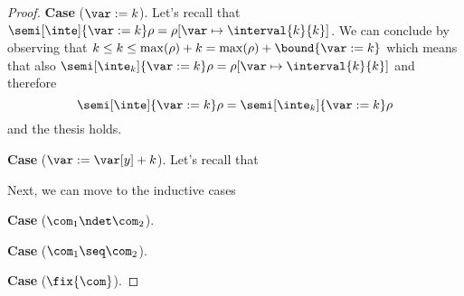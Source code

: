 \begin{proof}
  \medskip
  
  \noindent
  \textbf{Case} (\(\var := k\)).
  Let's recall that
  \({\semi[\inte]{\var := k}\rho = \rho[\var \mapsto \interval{k}{k}
    ]}\). We can conclude by observing that
  \({k \leq k \leq \max(\rho) + k = \max(\rho) + \bound{\var := k}}\)
  which means that also
  \({\semi[\inte_k]{\var := k}\rho = \rho[\var \mapsto
    \interval{k}{k}]}\) and therefore
  \begin{equation*}
    \semi[\inte]{\var := k}\rho = \semi[\inte_k]{\var := k}\rho
  \end{equation*}
  and the thesis holds.

  \medskip
  
  \noindent
  \textbf{Case} (\(\var := \var[y] + k\)).
  Let's recall that
  
  \medskip
  \noindent
  Next, we can move to the inductive cases
  
  \medskip
  
  \noindent
  \textbf{Case} (\(\com_1 \ndet \com_2\)).

  \medskip
  
  \noindent
  \textbf{Case} (\(\com_1 \seq \com_2\)).

  \medskip
  
  \noindent
  \textbf{Case} (\(\fix{\com}\)).
\end{proof}
